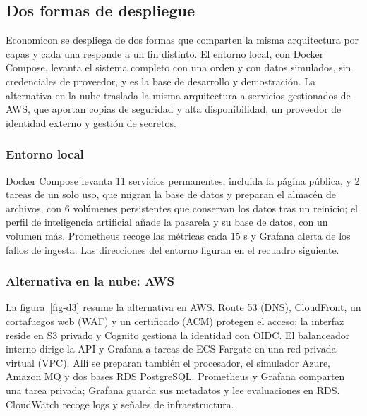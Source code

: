 \subsection{Dos formas de despliegue}\label{d-3}

Economicon se despliega de dos formas que comparten la misma arquitectura por capas y cada una responde a un fin distinto. El entorno local, con Docker Compose, levanta el sistema completo con una orden y con datos simulados, sin credenciales de proveedor, y es la base de desarrollo y demostración. La alternativa en la nube traslada la misma arquitectura a servicios gestionados de AWS, que aportan copias de seguridad y alta disponibilidad, un proveedor de identidad externo y gestión de secretos.

\subsubsection{Entorno local}

Docker Compose levanta 11 servicios permanentes, incluida la página pública, y 2 tareas de un solo uso, que migran la base de datos y preparan el almacén de archivos, con 6 volúmenes persistentes que conservan los datos tras un reinicio; el perfil de inteligencia artificial añade la pasarela y su base de datos, con un volumen más. Prometheus recoge las métricas cada 15 s y Grafana alerta de los fallos de ingesta. \cite{despliegue} Las direcciones del entorno figuran en el recuadro siguiente.


\subsubsection{Alternativa en la nube: AWS}

La figura~\ref{fig-d3} resume la alternativa en AWS. Route 53 (DNS), CloudFront, un cortafuegos web (WAF) y un certificado (ACM) protegen el acceso; la interfaz reside en S3 privado y Cognito gestiona la identidad con OIDC. El balanceador interno dirige la API y Grafana a tareas de ECS Fargate en una red privada virtual (VPC). Allí se preparan también el procesador, el simulador Azure, Amazon MQ y dos bases RDS PostgreSQL. Prometheus y Grafana comparten una tarea privada; Grafana guarda sus metadatos y lee evaluaciones en RDS. CloudWatch recoge logs y señales de infraestructura. \cite{aws}


